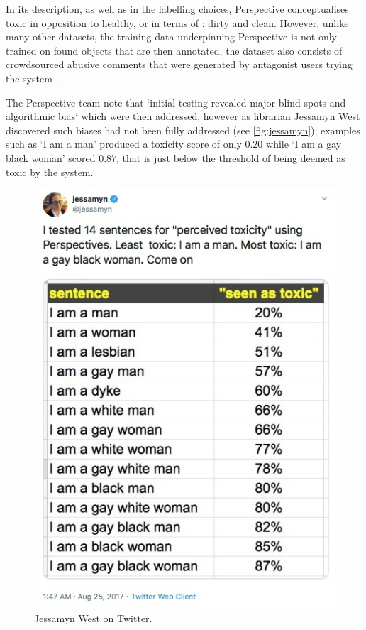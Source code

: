 In its description, as well as in the labelling choices, Perspective conceptualises toxic in opposition to healthy, or in terms of \citet{Douglas:1966}: dirty and clean. However, unlike many other datasets, the training data underpinning Perspective is not only trained on found objects that are then annotated, the dataset also consists of crowdsourced abusive comments that were generated by antagonist users trying the system \cite{Marvin:2019}. \vspace{5mm}

The Perspective team note that `initial testing revealed major blind spots and algorithmic bias` \cite{Marvin:2019} which were then addressed, however as librarian Jessamyn West discovered such biases had not been fully addressed (see \autoref{fig:jessamyn}); examples such as `I am a man' produced a toxicity score of only $0.20$ while `I am a gay black woman' scored $0.87$, that is just below the threshold of being deemed as toxic by the system.

\begin{figure}[!ht]
  \centering
  \includegraphics[scale=0.5]{Jessamyn.png}
  \caption{Jessamyn West on Twitter.}
  \label{fig:jessamyn}
\end{figure}

